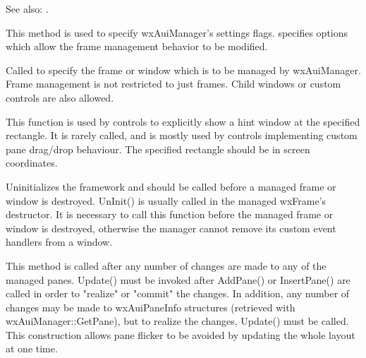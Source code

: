 See also: .

\label{wxauimanagersetflags}


This method is used to specify wxAuiManager's settings flags. 
specifies options which allow the frame management behavior to be modified.

\label{wxauimanagersetmanagedwindow}


Called to specify the frame or window which is to be managed by wxAuiManager.  Frame management is not restricted to just frames.  Child windows or custom controls are also allowed.

\label{wxauimanagershowhint}


This function is used by controls to explicitly show a hint window at the specified rectangle.  It is rarely called, and is mostly used by controls implementing custom pane drag/drop behaviour.  The specified rectangle should be in screen coordinates.

\label{wxauimanageruninit}


Uninitializes the framework and should be called before a managed frame or window is destroyed. UnInit() is usually called in the managed wxFrame's destructor.  It is necessary to call this function before the managed frame or window is destroyed, otherwise the manager cannot remove its custom event handlers from a window.

\label{wxauimanagerupdate}


This method is called after any number of changes are
made to any of the managed panes. Update() must be invoked after
AddPane() or InsertPane() are called in order to "realize" or "commit"
the changes. In addition, any number of changes may be made to
wxAuiPaneInfo structures (retrieved with wxAuiManager::GetPane), but to
realize the changes, Update() must be called. This construction allows
pane flicker to be avoided by updating the whole layout at one time.

